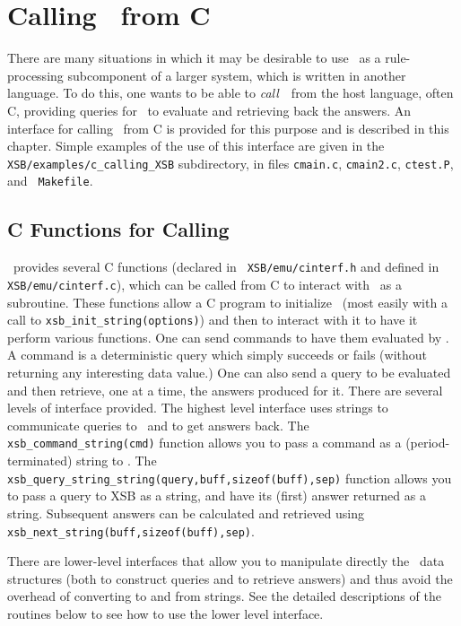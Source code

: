 \chapter{Calling \ourprolog\ from C}
\label{ccallingxsb}

There are many situations in which it may be desirable to use
\ourprolog\ as a rule-processing subcomponent of a larger system,
which is written in another language.  To do this, one wants to be
able to {\em call}\ \ourprolog\ from the host language, often C,
providing queries for \ourprolog\ to evaluate and retrieving back the
answers.  An interface for calling \ourprolog\ from C is provided for
this purpose and is described in this chapter.  Simple examples of
the use of this interface are given in the {\tt XSB/examples/c\_calling\_XSB}
subdirectory, in files {\tt cmain.c}, {\tt cmain2.c}, {\tt ctest.P}, and {\tt
Makefile}.

\section{C Functions for Calling \ourprolog}

\ourprolog\ provides several C functions (declared in {\tt
XSB/emu/cinterf.h} and defined in \\ {\tt XSB/emu/cinterf.c}), which can
be called from C to interact with \ourprolog\ as a subroutine. These
functions allow a C program to initialize \ourprolog\ (most easily with
a call to {\tt xsb\_init\_string(options)}) and then to interact with it
to have it perform various functions.  One can send commands to have
them evaluated by \ourprolog .  A command is a deterministic query which
simply succeeds or fails (without returning any interesting data value.)
One can also send a query to be evaluated and then retrieve, one at a
time, the answers produced for it.  There are several levels of
interface provided.  The highest level interface uses strings to
communicate queries to \ourprolog\ and to get answers back.  The {\tt
xsb\_command\_string(cmd)} function allows you to pass a command as a
(period-terminated) string to \ourprolog .  The {\tt
xsb\_query\_string\_string(query,buff,sizeof(buff),sep)} function allows
you to pass a query to XSB as a string, and have its (first) answer
returned as a string.  Subsequent answers can be calculated and
retrieved using {\tt xsb\_next\_string(buff,sizeof(buff),sep)}.

There are lower-level interfaces that allow you to manipulate directly
the \ourprolog\ data structures (both to construct queries and to
retrieve answers) and thus avoid the overhead of converting to and from
strings.  See the detailed descriptions of the routines below to see how
to use the lower level interface.


